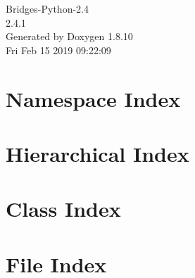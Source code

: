 \documentclass[twoside]{book}
\newcommand{\+}{\discretionary{\mbox{\scriptsize$\hookleftarrow$}}{}{}}
\newcommand{\clearemptydoublepage}{%
  \newpage{\pagestyle{empty}\cleardoublepage}%
}
\begin{document}
\hypersetup{pageanchor=false,
             bookmarks=true,
             bookmarksnumbered=true,
             pdfencoding=unicode
            }
\begin{titlepage}
\vspace*{7cm}
\begin{center}%
{\Large Bridges-\/\+Python-\/2.4 \\[1ex]\large 2.\+4.\+1 }\\
\vspace*{1cm}
{\large Generated by Doxygen 1.8.10}\\
\vspace*{0.5cm}
{\small Fri Feb 15 2019 09:22:09}\\
\end{center}
\end{titlepage}
\clearemptydoublepage
\tableofcontents
\clearemptydoublepage
{}
\hypersetup{pageanchor=true}

\chapter{Namespace Index}

\chapter{Hierarchical Index}

\chapter{Class Index}

\chapter{File Index}

\end{document}
